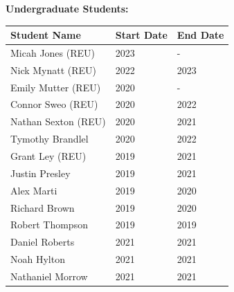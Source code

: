 \textbf{Undergraduate Students:}
\begin{table}[!h]
\centering
\begin{tabular}{|l|l|l|}
    \hline
    Student Name & Start Date & End Date \\ \hline
    Micah Jones (REU) & 2023 & - \\ \hline
    Nick Mynatt (REU) & 2022 & 2023 \\ \hline
    Emily Mutter (REU) & 2020 & - \\ \hline
    Connor Sweo (REU) & 2020 & 2022 \\ \hline
    Nathan Sexton (REU) & 2020 & 2021 \\ \hline
    Tymothy Brandlel & 2020 & 2022 \\ \hline
    Grant Ley (REU) & 2019 & 2021 \\ \hline
    Justin Presley & 2019 & 2021 \\ \hline
    Alex Marti & 2019 & 2020 \\ \hline
    Richard Brown & 2019 & 2020 \\ \hline
    Robert Thompson & 2019 & 2019 \\ \hline
    Daniel Roberts & 2021 & 2021 \\ \hline
    Noah Hylton & 2021 & 2021 \\ \hline
    Nathaniel Morrow & 2021 & 2021 \\ \hline
    \end{tabular}
\end{table}




		
